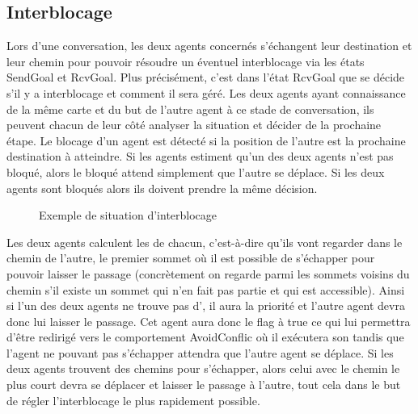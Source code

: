 \documentclass[11pt]{article}
\newcommand{\vertex}{\node[vertex]}
\begin{document}
\subsection{Interblocage}

Lors d'une conversation, les deux agents concernés s'échangent leur destination et leur chemin pour pouvoir résoudre un éventuel interblocage via les états \textsf{SendGoal} et \textsf{RcvGoal}. Plus précisément, c'est dans l'état \textsf{RcvGoal} que se décide s'il y a interblocage et comment il sera géré. Les deux agents ayant connaissance de la même carte et du but de l'autre agent à ce stade de conversation, ils peuvent chacun de leur côté analyser la situation et décider de la prochaine étape. Le blocage d'un agent est détecté si la position de l'autre est la prochaine destination à atteindre. Si les agents estiment qu'un des deux agents n'est pas bloqué, alors le bloqué attend simplement que l'autre se déplace. Si les deux agents sont bloqués alors ils doivent prendre la même décision.

\begin{figure}[ht!]
\centering
{}
\caption{Exemple de situation d'interblocage}
\label{fig-deadlock}
\end{figure}
Les deux agents calculent les  de chacun, c'est-à-dire qu'ils vont regarder dans le chemin de l'autre, le premier sommet où il est possible de s'échapper pour pouvoir laisser le passage (concrètement on regarde parmi les sommets voisins du chemin s'il existe un sommet qui n'en fait pas partie et qui est accessible). Ainsi si l'un des deux agents ne trouve pas d', il aura la priorité et l'autre agent devra donc lui laisser le passage. Cet agent aura donc le flag  à true ce qui lui permettra d'être redirigé vers le comportement \textsf{AvoidConflic} où il exécutera son  tandis que l'agent ne pouvant pas s'échapper attendra que l'autre agent se déplace. Si les deux agents trouvent des chemins pour s'échapper, alors celui avec le chemin le plus court devra se déplacer et laisser le passage à l'autre, tout cela dans le but de régler l'interblocage le plus rapidement possible.  
\end{document}
